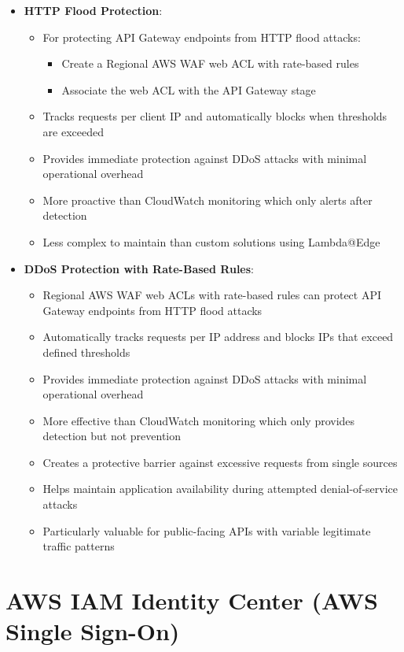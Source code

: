 \documentclass[11pt,a4paper]{report}
\begin{document}
\begin{itemize}
  \item \textbf{HTTP Flood Protection}:
\begin{itemize}
  \item For protecting API Gateway endpoints from HTTP flood attacks:
\begin{itemize}
  \item Create a Regional AWS WAF web ACL with rate-based rules
  \item Associate the web ACL with the API Gateway stage
\end{itemize}
  \item Tracks requests per client IP and automatically blocks when thresholds are exceeded
  \item Provides immediate protection against DDoS attacks with minimal operational overhead
  \item More proactive than CloudWatch monitoring which only alerts after detection
  \item Less complex to maintain than custom solutions using Lambda@Edge
\end{itemize}
  \item \textbf{DDoS Protection with Rate-Based Rules}:
\begin{itemize}
  \item Regional AWS WAF web ACLs with rate-based rules can protect API Gateway endpoints from HTTP flood attacks
  \item Automatically tracks requests per IP address and blocks IPs that exceed defined thresholds
  \item Provides immediate protection against DDoS attacks with minimal operational overhead
  \item More effective than CloudWatch monitoring which only provides detection but not prevention
  \item Creates a protective barrier against excessive requests from single sources
  \item Helps maintain application availability during attempted denial-of-service attacks
  \item Particularly valuable for public-facing APIs with variable legitimate traffic patterns
\end{itemize}
\end{itemize}


\section{AWS IAM Identity Center (AWS Single Sign-On)}
\end{document}
